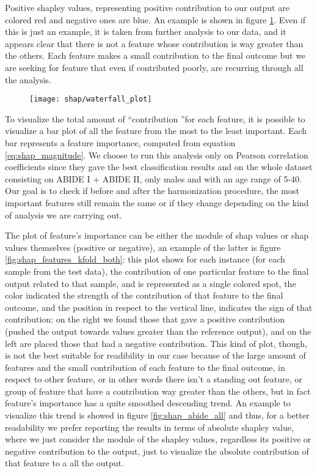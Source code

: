\documentclass[a4paper,11pt]{article}
\begin{document}
Positive shapley values, representing positive contribution to our output are colored red and negative ones are blue.
An example is shown in figure \ref{fig:shap_waterfall}.
Even if this is just an example, it is taken from further analysis to our data, and it appears clear that there is not a feature whose contribution is way greater than the others.
Each feature makes a small contribution to the final outcome but we are seeking for feature that even if contributed poorly, are recurring through all the analysis.





\begin{figure}[h]
\centering
\texttt{[image: shap/waterfall\_plot]}
\caption{}\label{fig:shap_waterfall}
\end{figure}


To visualize the total amount of \textquotedblleft contribution \textquotedblright for each feature, it is  possible to visualize a bar plot of all the feature from the most to the least important.
Each bar represents a feature importance, computed from equation \ref{eq:shap_magnitude}.
We choose to run this analysis only on Pearson correlation coefficients since they gave the best classification results and on the whole dataset consisting on ABIDE I + ABIDE II, only males and with an age range of 5-40.
Our goal is to check if before and after the harmonization procedure, the most important features still remain the same or if they change depending on the kind of analysis we are carrying out.

The plot of feature's importance can be either the module of shap values or shap values themselves (positive or negative), an example of the latter is figure \ref{fig:shap_features_kfold_both}: this plot shows for each instance (for each sample from the test data), the contribution of one particular feature to the final output related to that sample, and is represented as a single colored spot, the color indicated the strength of the contribution of that feature to the final outcome, and the position in respect to the vertical line, indicates the sign of that contribution: on the right we found those that gave a positive contribution (pushed the output towards values greater than the reference output), and on the left are placed those that had a negative contribution.
This kind of plot, though, is not the best suitable for readibility in our case because of the large amount of features and the small contribution of each feature to the final outcome, in respect to other feature, or in other words there isn't a standing out feature, or group of feature that have a contribution way greater than the others, but in fact feature's importance has a quite smoothed descending trend.
An example to visualize this trend is showed in figure \ref{fig:shap_abide_all} and thus, for a better readability we prefer reporting the results in terms of absolute shapley value, where we just consider the module of the shapley values, regardless its positive or negative contribution to the output,
just to visualize the absolute contribution of that feature to a all the output.
\end{document}

